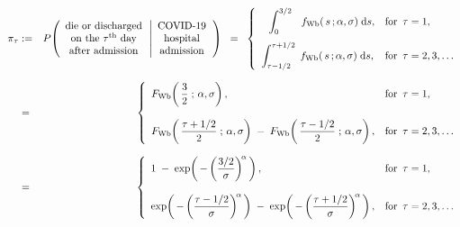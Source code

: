 \begin{eqnarray*}
\pi_{\tau}
& := &
	P\!\left(
		\begin{array}{c}
			\textnormal{die or discharged}
			\\
			\textnormal{on the $\tau^{\textnormal{th}}$ day}
			\\
			\textnormal{after admission}
			\end{array}
		\left\vert
		\begin{array}{c}
			\textnormal{COVID-19}
			\\
			\textnormal{hospital}
			\\
			\textnormal{admission}
			\end{array}
			\right.
		\right)
\;\; = \;\;
	\left\{\begin{array}{ll}
		{\color{white}..}\displaystyle\int_{0}^{3/2}\,{\color{white}..}f_{\textnormal{Wb}}(\,s\,;\alpha,\sigma) \;\d s,
		& \textnormal{for \,$\tau = 1$},
		\\
		\overset{{\color{white}1}}{\displaystyle\int_{\tau-1/2}^{\tau+1/2}\; f_{\textnormal{Wb}}(\,s\,;\alpha,\sigma) \;\d s},
		& \textnormal{for \,$\tau = 2,3,\ldots$}
		\end{array}\right.
\\
& = &
	\overset{{\color{white}1}}{\left\{\begin{array}{ll}
		F_{\textnormal{Wb}}\!\left(\,\dfrac{3}{2}\;;\,\alpha,\sigma\right),
		& \textnormal{for \,$\tau = 1$},
		\\ \\
		F_{\textnormal{Wb}}\!\left(\,\dfrac{\tau+1/2}{2}\;;\,\alpha,\sigma\right)
		\; - \;
		F_{\textnormal{Wb}}\!\left(\,\dfrac{\tau-1/2}{2}\;;\,\alpha,\sigma\right),
		& \textnormal{for \,$\tau = 2,3,\ldots$}
		\end{array}\right.}
\\
& = &
	\overset{{\color{white}1}}{\left\{\begin{array}{ll}
		1 \; - \; \exp\!\left(\,-\left(\dfrac{3/2}{\sigma}\right)^{\!\alpha}\,\right),
		& \textnormal{for \,$\tau = 1$},
		\\ \\
		\exp\!\left(\,-\left(\dfrac{\tau-1/2}{\sigma}\right)^{\!\alpha}\,\right)
		\; - \;
		\exp\!\left(\,-\left(\dfrac{\tau+1/2}{\sigma}\right)^{\!\alpha}\,\right),
		& \textnormal{for \,$\tau = 2,3,\ldots$}
		\end{array}\right.}
\end{eqnarray*}

